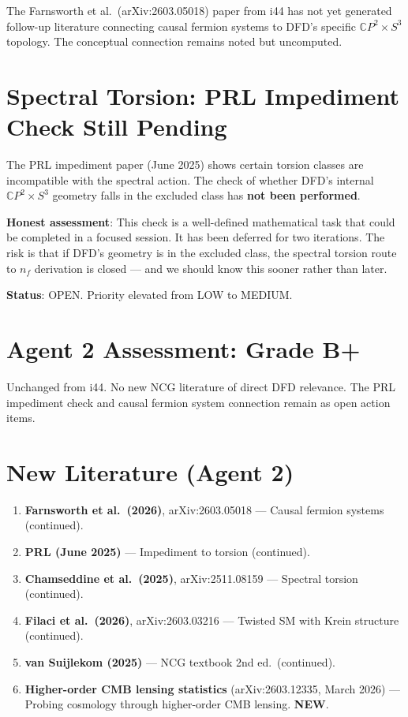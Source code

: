 \documentclass[11pt,a4paper]{article}
\newcommand{\NEW}{\textcolor{dfdblue}{\textbf{NEW}}}
\newcommand{\CP}{\mathbb{C}P}
\begin{document}
The Farnsworth et al.\ (arXiv:2603.05018) paper from i44 has not yet generated follow-up literature connecting causal fermion systems to DFD's specific $\CP^2 \times S^3$ topology. The conceptual connection remains noted but uncomputed.

\section{Spectral Torsion: PRL Impediment Check Still Pending}

\begin{tcolorbox}[colback=yellow!5!white, colframe=yellow!60!black,
  title={ACTION ITEM FROM i44: Check PRL impediment against DFD torsion}]

The PRL impediment paper (June 2025) shows certain torsion classes are incompatible with the spectral action. The check of whether DFD's internal $\CP^2 \times S^3$ geometry falls in the excluded class has \textbf{not been performed}.

\textbf{Honest assessment}: This check is a well-defined mathematical task that could be completed in a focused session. It has been deferred for two iterations. The risk is that if DFD's geometry is in the excluded class, the spectral torsion route to $n_f$ derivation is closed --- and we should know this sooner rather than later.

\textbf{Status}: OPEN. Priority elevated from LOW to MEDIUM.
\end{tcolorbox}

\section{Agent 2 Assessment: Grade B+}

Unchanged from i44. No new NCG literature of direct DFD relevance. The PRL impediment check and causal fermion system connection remain as open action items.

\section{New Literature (Agent 2)}

\begin{enumerate}
\item \textbf{Farnsworth et al.\ (2026)}, arXiv:2603.05018 --- Causal fermion systems (continued).
\item \textbf{PRL (June 2025)} --- Impediment to torsion (continued).
\item \textbf{Chamseddine et al.\ (2025)}, arXiv:2511.08159 --- Spectral torsion (continued).
\item \textbf{Filaci et al.\ (2026)}, arXiv:2603.03216 --- Twisted SM with Krein structure (continued).
\item \textbf{van Suijlekom (2025)} --- NCG textbook 2nd ed.\ (continued).
\item \textbf{Higher-order CMB lensing statistics} (arXiv:2603.12335, March 2026) --- Probing cosmology through higher-order CMB lensing. \NEW.
\end{enumerate}
\end{document}
